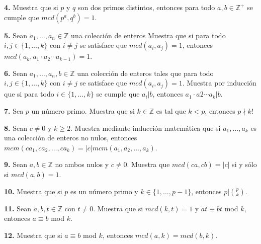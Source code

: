 \documentclass[12pt]{article}
\begin{document}
\vspace{1cm}

%
%
\textbf{4.} Muestra que si $p$ y $q$ son dos primos distintos, entonces para todo $a, b \in \mathbb{Z}^+$ se cumple que 
$mcd(p^a, q^b) = 1$.

\vspace{1cm}

%
%
\textbf{5.} Sean $a_1, \dots, a_n \in \mathbb{Z}$ una colección de enteros Muestra que si para todo $i, j \in \{1, . . . , k \}$ 
con $i \neq j$ se satisface que $mcd(a_i, a_j ) = 1$, entonces $mcd(a_k , a_1  \cdot a_2 \cdots a_{k-1}) = 1$.

\vspace{1cm}

%
%
\textbf{6.} Sean $a_1, \dots, a_n, b \in \mathbb{Z}$ una colección de enteros tales que para todo $i, j \in \{1, \dots, k\}$ con $i \neq j$
se satisface que $mcd(a_i, a_j ) = 1$. Muestra por inducción que si para todo $i \in \{1, \dots, k \}$ se cumple que $a_i |b$, entonces
$a_1 \cdot a2 \cdots a_k |b$.
\vspace{1cm}

%
%
\textbf{7.} Sea $p$ un número primo. Muestra que si $k \in \mathbb{Z}$ es tal que $k < p$, entonces $p \nmid k!$

\vspace{1cm}

%
%
\textbf{8.} Sean $c \neq 0$ y $k \geq 2$. Muestra mediante inducción matemática que si $a_1, \dots, a_k$ es una colección de
enteros no nulos, entonces $mcm(ca_1, ca_2, \dots, ca_k ) = |c|mcm(a_1, a_2, \dots, a_k )$.
\vspace{1cm}

%
%
\textbf{9.} Sean $a, b \in \mathbb{Z}$ no ambos nulos y $c \neq 0$. Muestra que $mcd(ca, cb) = |c|$ si y sólo si $mcd(a, b) = 1$.

\vspace{1cm}

%
%
\textbf{10.} Muestra que si $p$ es un número primo y $k \in \{1, \dots, p-1 \}$, entonces $p | \binom{p}{k}$.

\vspace{1cm}
%
%
\textbf{11.} Sean $a, b, t \in \mathbb{Z}$ con $t \neq 0$. Muestra que si $mcd(k, t) = 1$ y $at \equiv bt$ mod $k$, entonces $a \equiv b$ mod $k$.

\vspace{1cm}
%
%
\textbf{12.} Muestra que si $a \equiv b$ mod $k$, entonces $mcd(a, k) = mcd(b, k)$.
\end{document}
